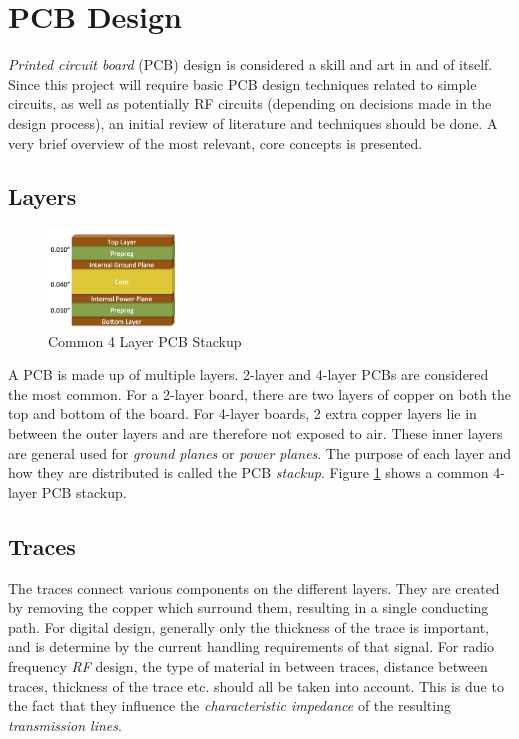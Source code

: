 \graphicspath{{./figures}}

\section{PCB Design}

\textit{Printed circuit board} (PCB) design is considered a skill and art in and of itself. Since this project will require basic PCB design techniques related to simple circuits, as well as potentially RF circuits (depending on decisions made in the design process), an initial review of literature and techniques should be done. A very brief overview of the most relevant, core concepts is presented.

\subsection{Layers}
\begin{figure}[!htb]
  \centering
  \includegraphics[width=0.3\textwidth]{4layerPCB}
  \caption{Common 4 Layer PCB Stackup \cite{site-4layerPCB}}
  \label{fig:4layerPCB}
\end{figure}

A PCB is made up of multiple layers. 2-layer and 4-layer PCBs are considered the most common. For a 2-layer board, there are two layers of copper on both the top and bottom of the board. For 4-layer boards, 2 extra copper layers lie in between the outer layers and are therefore not exposed to air. These inner layers are general used for \textit{ground planes} or \textit{power planes}. The purpose of each layer and how they are distributed is called the PCB \textit{stackup}. Figure \ref{fig:4layerPCB} shows a common 4-layer PCB stackup. \cite{site-pcbLayers}

\subsection{Traces}
The traces connect various components on the different layers. They are created by removing the copper which surround them, resulting in a single conducting path. For digital design, generally only the thickness of the trace is important, and is determine by the current handling requirements of that signal. For radio frequency \textit{RF} design, the type of material in between traces, distance between traces, thickness of the trace etc. should all be taken into account. This is due to the fact that they influence the \textit{characteristic impedance} of the resulting \textit{transmission lines}.

